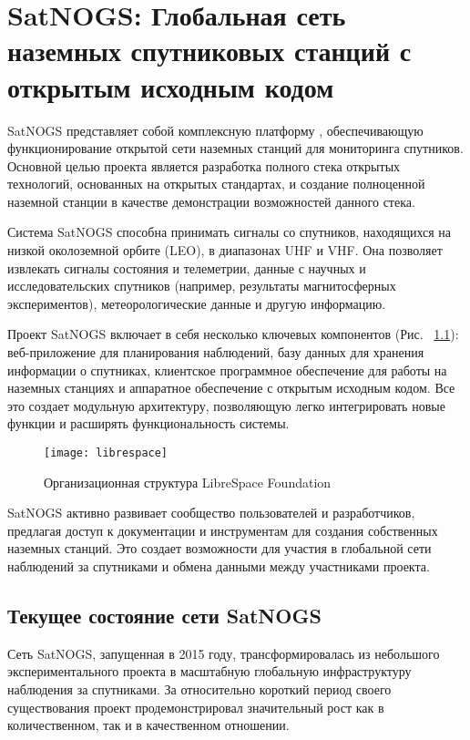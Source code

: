\chapter{SatNOGS: Глобальная сеть наземных спутниковых станций с открытым исходным кодом}

SatNOGS представляет собой комплексную платформу \cite{satnogs_general_docs},
обеспечивающую функционирование открытой сети наземных станций для мониторинга
спутников. Основной целью проекта является разработка полного стека открытых
технологий, основанных на открытых стандартах, и создание полноценной наземной
станции в качестве демонстрации возможностей данного стека.

Система SatNOGS способна принимать сигналы со спутников, находящихся на низкой
околоземной орбите (LEO), в диапазонах UHF и VHF. Она позволяет извлекать
сигналы состояния и телеметрии, данные с научных и исследовательских спутников
(например, результаты магнитосферных экспериментов), метеорологические данные и
другую информацию.

Проект SatNOGS включает в себя несколько ключевых компонентов (Рис. ~\ref{fig:librespace}): веб-приложение
для планирования наблюдений, базу данных для хранения информации о спутниках,
клиентское программное обеспечение для работы на наземных станциях и аппаратное
обеспечение с открытым исходным кодом. Все это создает модульную архитектуру,
позволяющую легко интегрировать новые функции и расширять функциональность
системы.

\begin{figure}[htbp]
	\centering
	\texttt{[image: librespace]}
	\caption{Организационная структура LibreSpace Foundation}
	\label{fig:librespace}
\end{figure}

SatNOGS активно развивает сообщество пользователей и разработчиков, предлагая
доступ к документации и инструментам для создания собственных наземных станций.
Это создает возможности для участия в глобальной сети наблюдений за спутниками
и обмена данными между участниками проекта.

\section{Текущее состояние сети SatNOGS}

Сеть SatNOGS, запущенная в 2015 году, трансформировалась из небольшого
экспериментального проекта в масштабную глобальную инфраструктуру наблюдения за
спутниками. За относительно короткий период своего существования проект
продемонстрировал значительный рост как в количественном, так и в качественном
отношении.

